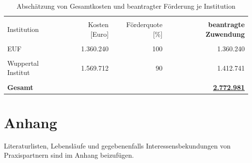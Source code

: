 \documentclass[a4paper,11pt,twoside]{scrartcl}
\begin{document}
\begin{table}[h]
\begin{center}
  \caption{Abschätzung von Gesamtkosten und beantragter Förderung je Institution}
\begin{tabular}[h]{|l | r | r | r|}
\hline
&&&\\
Institution & Kosten [Euro] & Förderquote [\%] & \textbf{beantragte Zuwendung}\\
\hline
\hline
 &&&\\
 EUF & 1.360.240 & 100 & 1.360.240\\
 \hline
 &&&\\
 Wuppertal Institut & 1.569.712 & 90 & 1.412.741

\\
 \hline
 \hline
 &&&\\
 \textbf{Gesamt} & & &\underline{\textbf{2.772.981}}\\
 \hline
 \end{tabular}
 \label{tab:kostenkalkulation2}
\end{center}
\end{table}

\clearpage


%


\clearpage
\appendix

\section{Anhang}

Literaturlisten, Lebensläufe und gegebenenfalls Interessensbekundungen von Praxispartnern sind im Anhang beizufügen.
\end{document}
